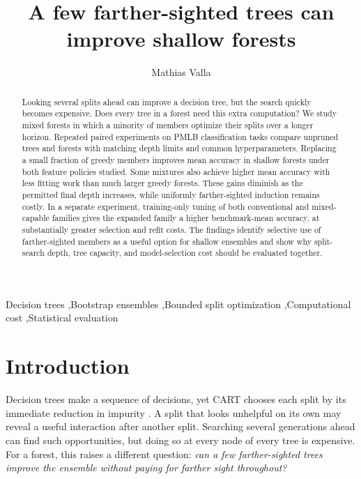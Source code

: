 \documentclass[final,5p,times]{elsarticle}
\begin{document}
\begin{frontmatter}
\title{A few farther-sighted trees can improve shallow forests}
\author[1]{Mathias Valla}
\begin{abstract}
Looking several splits ahead can improve a decision tree, but the search quickly becomes expensive. Does every tree in a forest need this extra computation? We study mixed forests in which a minority of members optimize their splits over a longer horizon. Repeated paired experiments on PMLB classification tasks compare unpruned trees and forests with matching depth limits and common hyperparameters. Replacing a small fraction of greedy members improves mean accuracy in shallow forests under both feature policies studied. Some mixtures also achieve higher mean accuracy with less fitting work than much larger greedy forests. These gains diminish as the permitted final depth increases, while uniformly farther-sighted induction remains costly. In a separate experiment, training-only tuning of both conventional and mixed-capable families gives the expanded family a higher benchmark-mean accuracy, at substantially greater selection and refit costs. The findings identify selective use of farther-sighted members as a useful option for shallow ensembles and show why split-search depth, tree capacity, and model-selection cost should be evaluated together.
\end{abstract}
\begin{keyword}
Decision trees \sep Bootstrap ensembles \sep Bounded split optimization \sep Computational cost \sep Statistical evaluation
\end{keyword}
\end{frontmatter}

\section{Introduction}
Decision trees make a sequence of decisions, yet CART chooses each split by its immediate reduction in impurity \cite{breiman1984cart}. A split that looks unhelpful on its own may reveal a useful interaction after another split. Searching several generations ahead can find such opportunities, but doing so at every node of every tree is expensive. For a forest, this raises a different question: \emph{can a few farther-sighted trees improve the ensemble without paying for farther sight throughout?}
\end{document}
